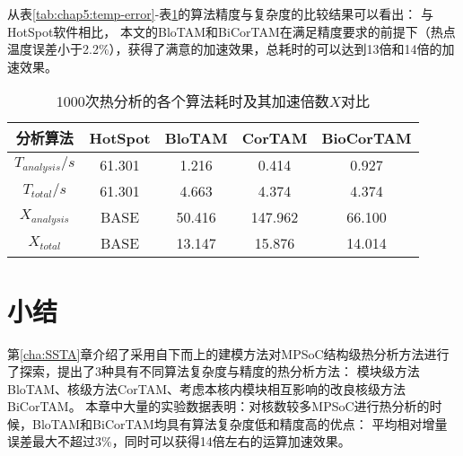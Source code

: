 从表\ref{tab:chap5:temp-error}-表\ref{tab:chap5:time-speedup}的算法精度与复杂度的比较结果可以看出： 与HotSpot软件相比， 本文的BloTAM和BiCorTAM在满足精度要求的前提下（热点温度误差小于2.2\%），获得了满意的加速效果，总耗时的可以达到13倍和14倍的加速效果。

\begin{table}
\centering
\caption{1000次热分析的各个算法耗时及其加速倍数$X$对比}
\begin{tabular}{c c c c c}
\hline\hline
分析算法 & HotSpot & BloTAM & CorTAM & BioCorTAM \\ [0.5ex]
\hline
$T_{analysis}/s$ & 61.301 & 1.216 & 0.414 & 0.927 \\
\hline
$T_{total}/s$ & 61.301 & 4.663 & 4.374 & 4.374 \\
\hline
$X_{analysis}$ & BASE & 50.416 & 147.962 & 66.100 \\
\hline
$X_{total}$ & BASE & 13.147 & 15.876 & 14.014 \\
\hline
\end{tabular}
\label{tab:chap5:time-speedup}
\end{table}

\section{小结}
第\ref{cha:SSTA}章介绍了采用自下而上的建模方法对MPSoC结构级热分析方法进行了探索，提出了3种具有不同算法复杂度与精度的热分析方法： 模块级方法BloTAM、核级方法CorTAM、考虑本核内模块相互影响的改良核级方法BiCorTAM。 本章中大量的实验数据表明：对核数较多MPSoC进行热分析的时候，BloTAM和BiCorTAM均具有算法复杂度低和精度高的优点： 平均相对增量误差最大不超过3\%，同时可以获得14倍左右的运算加速效果。
